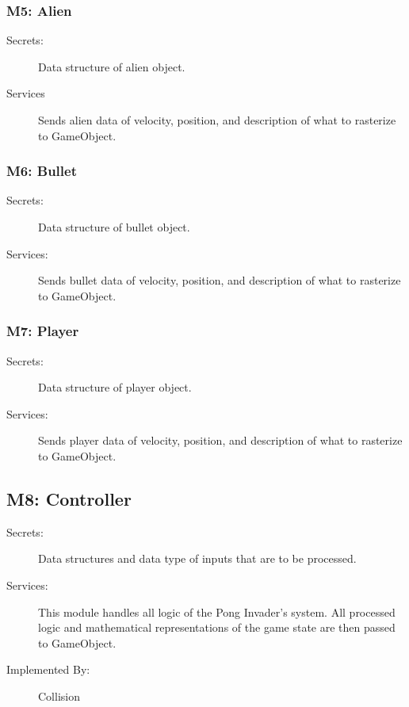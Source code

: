 \documentclass[12pt, titlepage]{article}
\begin{document}
\subsubsection{M5: Alien}
\begin{description}
\item[Secrets:] Data structure of alien object.
\item[Services] Sends alien data of velocity, position, and description of what to rasterize to GameObject.
\end{description}

\subsubsection{M6: Bullet}
\begin{description}
\item[Secrets:] Data structure of bullet object.
\item[Services:] Sends bullet data of velocity, position, and description of what to rasterize to GameObject.
\end{description}

\subsubsection{M7: Player}
\begin{description}
\item[Secrets:] Data structure of player object.
\item[Services:] Sends player data of velocity, position, and description of what to rasterize to GameObject.
\end{description}

\subsection{M8: Controller}
\begin{description}
\item[Secrets:] Data structures and data type of inputs that are to be processed.
\item[Services:] This module handles all logic of the Pong Invader's system. All processed logic and mathematical representations of the game state are then passed to GameObject. 
\item[Implemented By:] Collision
\end{description}
\end{document}
